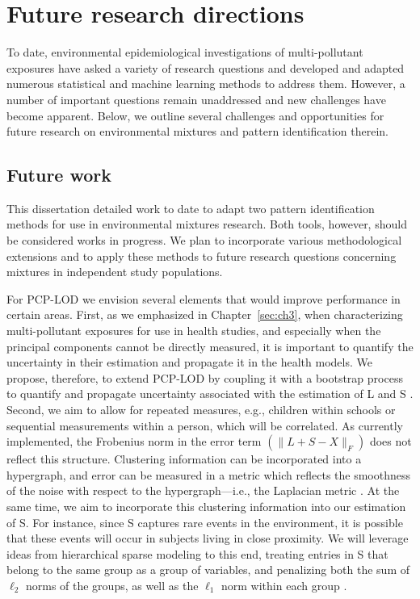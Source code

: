 \section{Future research directions}\label{sec:future}
To date, environmental epidemiological investigations of multi-pollutant exposures have asked a variety of research questions and developed and adapted numerous statistical and machine learning methods to address them. However, a number of important questions remain unaddressed and new challenges have become apparent. Below, we outline several challenges and opportunities for future research on environmental mixtures and pattern identification therein.

\subsection{Future work}\label{diss:future}
This dissertation detailed work to date to adapt two pattern identification methods for use in environmental mixtures research. Both tools, however, should be considered works in progress. We plan to incorporate various methodological extensions and to apply these methods to future research questions concerning mixtures in independent study populations.

For PCP-LOD we envision several elements that would improve performance in certain areas. First, as we emphasized in Chapter~\ref{sec:ch3}, when characterizing multi-pollutant exposures for use in health studies, and especially when the principal components cannot be directly measured, it is important to quantify the uncertainty in their estimation and propagate it in the health models. We propose, therefore, to extend PCP-LOD by coupling it with a bootstrap process to quantify and propagate uncertainty associated with the estimation of L and S \citep{mak14_unc}. Second, we aim to allow for repeated measures, e.g., children within schools or sequential measurements within a person, which will be correlated. As currently implemented, the Frobenius norm in the error term $\left( \|L+S-X\|_{F} \right)$ does not reflect this structure. Clustering information can be incorporated into a hypergraph, and error can be measured in a metric which reflects the smoothness of the noise with respect to the hypergraph---i.e., the Laplacian metric \citep{zhou2006learning, kaminski2019clustering}. At the same time, we aim to incorporate this clustering information into our estimation of S. For instance, since S captures rare events in the environment, it is possible that these events will occur in subjects living in close proximity. We will leverage ideas from hierarchical sparse modeling to this end, treating entries in S that belong to the same group as a group of variables, and penalizing both the sum of $\ell_2$ norms of the groups, as well as the $\ell_1$ norm within each group \citep{yan2017hierarchical, sprechmann2011c, jenatton2011proximal}.

